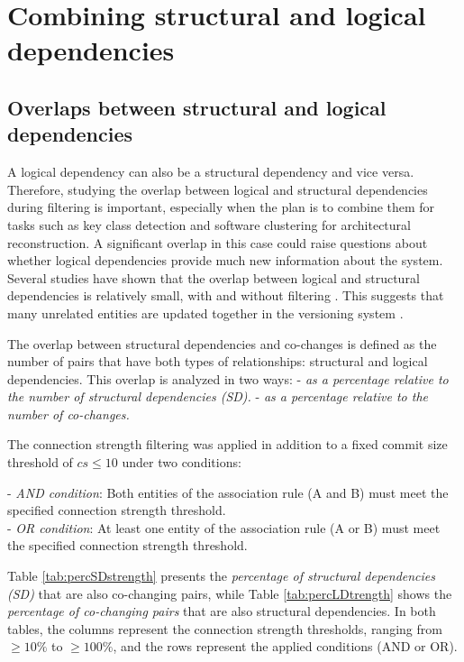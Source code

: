 
\chapter{Combining structural and logical dependencies}
\label{chap:combining_dependencies}


\section{Overlaps between structural and logical dependencies}
\label{sec:dependency_overlaps}

\hspace{4em}A logical dependency can also be a structural dependency and vice versa. Therefore, studying the overlap between logical and structural dependencies during filtering is important, especially when the plan is to combine them for tasks such as key class detection and software clustering for architectural reconstruction. A significant overlap in this case could raise questions about whether logical dependencies provide much new information about the system.
Several studies have shown that the overlap between logical and structural dependencies is relatively small, with and without filtering \cite{DBLP:journals/jss/AjienkaC17}. This suggests that many unrelated entities are updated together in the versioning system \cite{enase19, cluster-access}.

The overlap between structural dependencies and co-changes is defined as the number of pairs that have both types of relationships: structural and logical dependencies. This overlap is analyzed in two ways:
\hspace{-4em}- \textit{as a percentage relative to the number of structural dependencies (SD).}
- \textit{as a percentage relative to the number of co-changes.}

The connection strength filtering was applied in addition to a fixed commit size threshold of \(cs \leq 10\) under two conditions:   

\hspace{-4em}- \textit{AND condition}: Both entities of the association rule (A and B) must meet the specified connection strength threshold. \\  
- \textit{OR condition}: At least one entity of the association rule (A or B) must meet the specified connection strength threshold.

Table \ref{tab:percSDstrength} presents the \textit{percentage of structural dependencies (SD)} that are also co-changing pairs, while Table \ref{tab:percLDtrength} shows the \textit{percentage of co-changing pairs} that are also structural dependencies. In both tables, the columns represent the connection strength thresholds, ranging from \( \geq 10\% \) to \( \geq 100\% \), and the rows represent the applied conditions (AND or OR).




